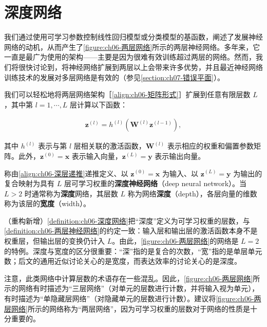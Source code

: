 \documentclass[../../main.tex]{subfiles}
\begin{document}
\section{深度网络}\label{section:ch06-深度网络}

我们通过使用可学习参数控制线性回归模型或分类模型的基函数，阐述了发展神经网络的动机，从而产生了\cref{figure:ch06-两层网络}所示的两层神经网络。多年来，它一直是最广为使用的架构——主要是因为很难有效训练超过两层的网络。然而，我们将很快讨论到，将神经网络扩展到两层以上会带来许多优势，并且最近神经网络训练技术的发展对多层网络是有效的（参见\cref{section:ch07-错误平面}）。

我们可以轻松地将两层网络架构［\eqref{align:ch06-矩阵形式}］扩展到任意有限层数 $L$，其中第 $l=1,\cdots,L$ 层计算以下函数：

\begin{align}
\boldsymbol{z}^{(l)}=h^{(l)}\!\left(\boldsymbol{W}^{(l)}\boldsymbol{z}^{(l-1)}\right),
\label{align:ch06-深层递推}
\end{align}

其中 $h^{(l)}$ 表示与第 $l$ 层相关联的激活函数，$\boldsymbol{W}^{(l)}$ 表示相应的权重和偏置参数矩阵。此外，$\boldsymbol{z}^{(0)}=\boldsymbol{x}$ 表示输入向量，$\boldsymbol{z}^{(L)}=\boldsymbol{y}$ 表示输出向量。

\begin{definition}[深度神经网络]\label{definition:ch06-深度网络}
称由\eqref{align:ch06-深层递推}递推定义、以 $\boldsymbol{z}^{(0)}=\boldsymbol{x}$ 为输入、以 $\boldsymbol{z}^{(L)}=\boldsymbol{y}$ 为输出的复合映射为具有 $L$ 层可学习权重的\textbf{深度神经网络}（deep neural network）。当 $L>2$ 时通常称为\textbf{深度}网络，其层数 $L$ 称为网络\textbf{深度}（depth），各层向量的维数称为该层的\textbf{宽度}（width）。
\end{definition}

\begin{remark}（重构新增）\cref{definition:ch06-深度网络}把“深度”定义为可学习权重的层数，与\cref{definition:ch06-两层神经网络}的约定一致：输入层和输出层的激活函数本身不是权重层，但输出层的变换仍计入 $L$。由此，\cref{figure:ch06-两层网络}的网络是 $L=2$ 的特例。深度与宽度的区分很重要：“深”指的是复合的次数，“宽”指的是单层单元数；后文的通用近似讨论关心的是宽度，而表达效率的讨论关心的是深度。
\end{remark}

注意，此类网络中计算层数的术语存在一些混乱。因此，\cref{figure:ch06-两层网络}所示的网络有时描述为“三层网络”（对单元的层数进行计数，并将输入视为单元），有时描述为“单隐藏层网络”（对隐藏单元的层数进行计数）。建议将\cref{figure:ch06-两层网络}所示的网络称为“两层网络”，因为可学习权重的层数对于网络的性质是十分重要的。
\end{document}
